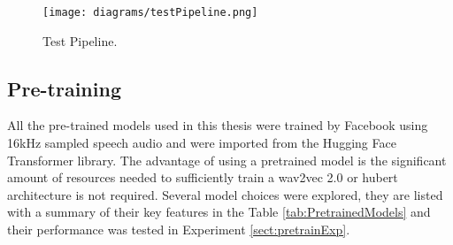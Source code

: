\begin{figure}[h!]
    \centering
    \texttt{[image: diagrams/testPipeline.png]}
    \caption{Test Pipeline.}
    \label{fig:testPipe}
\end{figure}
\pagebreak
\subsection{Pre-training}
All the pre-trained models used in this thesis were trained by Facebook using 16kHz sampled speech audio and were imported from the Hugging Face Transformer library. The advantage of using a pretrained 
model is the significant amount of resources needed to sufficiently train a wav2vec 2.0 or hubert architecture is not required. 
Several model choices were explored, they are listed with a summary of their key features in the Table \ref{tab:PretrainedModels} and their performance
was tested in Experiment \ref{sect:pretrainExp}. 

